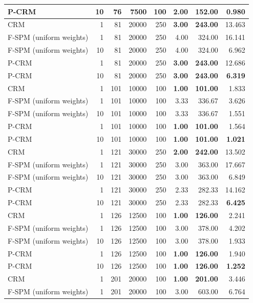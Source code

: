 \begin{tabular}{lrrrrrrr}
P-CRM & 10 & 76 & 7500 & 100 & \textbf{2.00} & \textbf{152.00} & \textbf{0.980} \\
\midrule
CRM & 1 & 81 & 20000 & 250 & \textbf{3.00} & \textbf{243.00} & 13.463 \\
F-SPM (uniform weights) & 1 & 81 & 20000 & 250 & 4.00 & 324.00 & 16.141 \\
F-SPM (uniform weights) & 10 & 81 & 20000 & 250 & 4.00 & 324.00 & 6.962 \\
P-CRM & 1 & 81 & 20000 & 250 & \textbf{3.00} & \textbf{243.00} & 12.686 \\
P-CRM & 10 & 81 & 20000 & 250 & \textbf{3.00} & \textbf{243.00} & \textbf{6.319} \\
\midrule
CRM & 1 & 101 & 10000 & 100 & \textbf{1.00} & \textbf{101.00} & 1.833 \\
F-SPM (uniform weights) & 1 & 101 & 10000 & 100 & 3.33 & 336.67 & 3.626 \\
F-SPM (uniform weights) & 10 & 101 & 10000 & 100 & 3.33 & 336.67 & 1.551 \\
P-CRM & 1 & 101 & 10000 & 100 & \textbf{1.00} & \textbf{101.00} & 1.564 \\
P-CRM & 10 & 101 & 10000 & 100 & \textbf{1.00} & \textbf{101.00} & \textbf{1.021} \\
\midrule
CRM & 1 & 121 & 30000 & 250 & \textbf{2.00} & \textbf{242.00} & 13.502 \\
F-SPM (uniform weights) & 1 & 121 & 30000 & 250 & 3.00 & 363.00 & 17.667 \\
F-SPM (uniform weights) & 10 & 121 & 30000 & 250 & 3.00 & 363.00 & 6.849 \\
P-CRM & 1 & 121 & 30000 & 250 & 2.33 & 282.33 & 14.162 \\
P-CRM & 10 & 121 & 30000 & 250 & 2.33 & 282.33 & \textbf{6.425} \\
\midrule
CRM & 1 & 126 & 12500 & 100 & \textbf{1.00} & \textbf{126.00} & 2.241 \\
F-SPM (uniform weights) & 1 & 126 & 12500 & 100 & 3.00 & 378.00 & 4.202 \\
F-SPM (uniform weights) & 10 & 126 & 12500 & 100 & 3.00 & 378.00 & 1.933 \\
P-CRM & 1 & 126 & 12500 & 100 & \textbf{1.00} & \textbf{126.00} & 1.940 \\
P-CRM & 10 & 126 & 12500 & 100 & \textbf{1.00} & \textbf{126.00} & \textbf{1.252} \\
\midrule
CRM & 1 & 201 & 20000 & 100 & \textbf{1.00} & \textbf{201.00} & 3.446 \\
F-SPM (uniform weights) & 1 & 201 & 20000 & 100 & 3.00 & 603.00 & 6.764 \\

\end{tabular}
